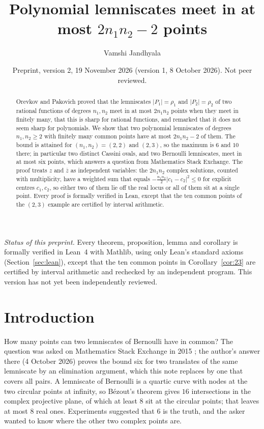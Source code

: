 \documentclass[11pt]{amsart}
\title{Polynomial lemniscates meet in at most $2n_1n_2-2$ points}
\author{Vamshi Jandhyala}
\date{Preprint, version 2, 19 November 2026 (version 1, 8 October 2026). Not peer reviewed.}
\theoremstyle{remark}\newtheorem{remark}[theorem]{Remark}
\theoremstyle{definition}\newtheorem{example}[theorem]{Example}
\newcommand{\cl}{\overline}
\begin{document}
\begin{abstract}
Orevkov and Pakovich proved that the lemniscates $|P_1|=\rho_1$ and $|P_2|=\rho_2$ of two rational functions of
degrees $n_1,n_2$ meet in at most $2n_1n_2$ points when they meet in finitely many, that this is sharp for rational
functions, and remarked that it does not seem sharp for polynomials. We show that two polynomial lemniscates of
degrees $n_1,n_2\ge2$ with finitely many common points have at most $2n_1n_2-2$ of them. The bound is attained for
$(n_1,n_2)=(2,2)$ and $(2,3)$, so the maximum is $6$ and $10$ there; in particular two distinct Cassini ovals, and
two Bernoulli lemniscates, meet in at most six points, which answers a question from Mathematics Stack Exchange.
The proof treats $z$ and $\cl z$ as independent variables: the $2n_1n_2$ complex solutions, counted with
multiplicity, have a weighted sum that equals $-\tfrac{n_1n_2}{2}|c_1-c_2|^2\le0$ for explicit centres $c_1,c_2$,
so either two of them lie off the real locus or all of them sit at a single point. Every proof is formally
verified in Lean, except that the ten common points of the $(2,3)$ example are certified by interval arithmetic.
\end{abstract}
\maketitle

\noindent\emph{Status of this preprint.} Every theorem, proposition, lemma and corollary is formally verified in
Lean~4 with Mathlib, using only Lean's standard axioms (Section~\ref{sec:lean}), except that the ten common points
in Corollary~\ref{cor:23} are certified by interval arithmetic and rechecked by an independent program. This version
has not yet been independently reviewed.

\section{Introduction}\label{sec:intro}

How many points can two lemniscates of Bernoulli have in common? The question was asked on Mathematics Stack
Exchange in 2015 \cite{mse}; the author's answer there \cite{mseA} (4 October 2026) proves the bound six for two
translates of the same lemniscate by an elimination argument, which this note replaces by one that covers all pairs. A lemniscate of Bernoulli is a quartic curve with nodes at the two circular points at
infinity, so B\'ezout's theorem gives $16$ intersections in the complex projective plane, of which at least $8$ sit
at the circular points; that leaves at most $8$ real ones. Experiments suggested that $6$ is the truth, and the
asker wanted to know where the other two complex points are.
\end{document}
